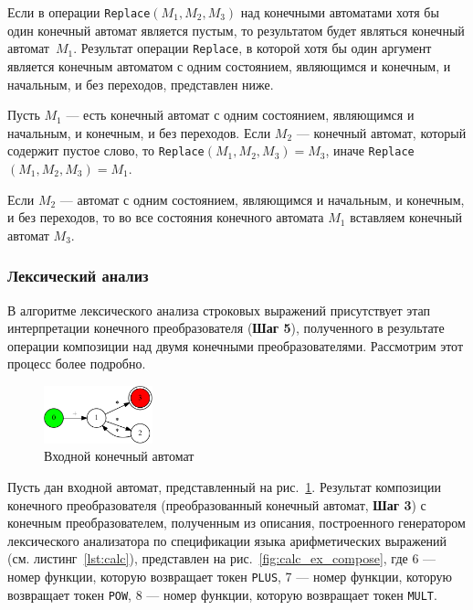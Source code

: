 Если в операции \verb|Replace|$(M_1, M_2, M_3)$ над конечными автоматами хотя бы один конечный автомат является пустым, то результатом будет являться конечный автомат~$M_1$. Результат операции \verb|Replace|, в которой хотя бы один аргумент является конечным автоматом с одним состоянием, являющимся и конечным, и начальным, и без переходов, представлен ниже.

Пусть $M_1$ --- есть конечный автомат с одним состоянием, являющимся и начальным, и конечным, и без переходов. Если $M_2$ --- конечный автомат, который содержит пустое слово, то \verb|Replace|$(M_1, M_2, M_3) = M_3$, иначе \verb|Replace|$(M_1, M_2, M_3) = M_1$. 

Если $M_2$ --- автомат с одним состоянием, являющимся и начальным, и конечным, и без переходов, то во все состояния конечного автомата $M_1$ вставляем конечный автомат $M_3$. 

\subsubsection{Лексический анализ}

В алгоритме лексического анализа строковых выражений присутствует этап интерпретации конечного преобразователя (\textbf{Шаг 5}), полученного в результате операции композиции над двумя конечными преобразователями. Рассмотрим этот процесс более подробно. 

\begin{figure}[H]
\begin{center}
\includegraphics[width=0.28\textwidth]{Polubelova/calc_ex}
\caption{Входной конечный автомат}
\label{fig:calc_ex} 
\end{center}
\end{figure}
Пусть дан входной автомат, представленный на рис.~\ref{fig:calc_ex}. Результат композиции конечного преобразователя (преобразованный конечный автомат, \textbf{Шаг 3}) с конечным преобразователем, полученным из описания, построенного генератором лексического анализатора по спецификации языка арифметических выражений (см. листинг~\ref{lst:calc}), представлен на рис.~\ref{fig:calc_ex_compose}, где 6 --- номер функции, которую возвращает токен \verb|PLUS|, 7 --- номер функции, которую возвращает токен \verb|POW|, 8 --- номер функции, которую возвращает токен \verb|MULT|.

